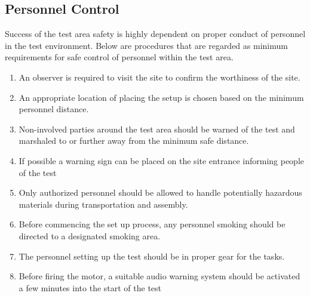 \documentclass[12pt,letterpaper]{article}
\begin{document}
        \subsection{Personnel Control}
             \noindent Success of the test area safety is highly dependent
             on proper conduct of personnel in the test environment. Below
             are procedures that are regarded as minimum requirements for
             safe control of personnel within the test area.
             \begin{enumerate}
                 \begin{enumerate}                  
                     \item An observer is required to visit the site to
                     confirm the worthiness of the site.
                     \item An appropriate location of placing the setup
                     is chosen based on the minimum personnel distance.
                     \item Non-involved parties around the test area
                     should be warned of the test and marshaled to or
                     further away from the minimum safe distance. 
                     \item If possible a warning sign can be placed on
                     the site entrance informing people of the test 
                     \item Only authorized personnel should be allowed to
                     handle potentially hazardous materials during
                     transportation and assembly.
                     \item Before commencing the set up process, any
                     personnel smoking should be directed to a designated
                     smoking area.
                     \item The personnel setting up the test should be in
                     proper gear for the tasks.
                     \item Before firing the motor, a suitable audio warning
                     system should be activated a few minutes into the start
                     of the test
                 \end{enumerate}
             \end{enumerate}
\end{document}
